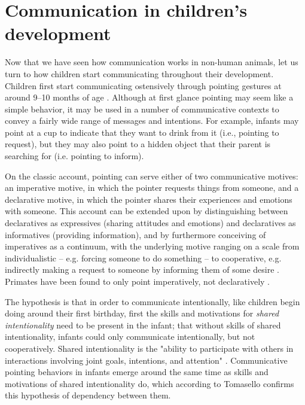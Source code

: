 \section{Communication in children's development}
\label{sec:comm:ontogeny}

Now that we have seen how communication works in non-human animals, let us turn to how children start communicating throughout their development.
Children first start communicating ostensively through pointing gestures at around 9--10 months of age \citep[pp.~20--21 and references therein]{Carpenter98}.
Although at first glance pointing may seem like a simple behavior, it may be used in a number of communicative contexts to convey a fairly wide range of messages and intentions.
For example, infants may point at a cup to indicate that they want to drink from it (i.e., pointing to request), but they may also point to a hidden object that their parent is searching for (i.e. pointing to inform).

On the classic account, pointing can serve either of two communicative motives: an imperative motive, in which the pointer requests things from someone, and a declarative motive, in which the pointer shares their experiences and emotions with someone.
This account can be extended upon by distinguishing between declaratives as expressives (sharing attitudes and emotions) and declaratives as informatives (providing information), and by furthermore conceiving of imperatives as a continuum, with the underlying motive ranging on a scale from individualistic -- e.g. forcing someone to do something -- to cooperative, e.g. indirectly making a request to someone by informing them of some desire \citep{Tomasello08}.
Primates have been found to only point imperatively, not declaratively \citep{Gomez04, Tomasello05}.

The hypothesis is that in order to communicate intentionally,
like children begin doing around their first birthday, first the skills and motivations for \emph{shared intentionality} need to be present in the infant; that without skills of shared intentionality, infants could only communicate intentionally, but not cooperatively.
Shared intentionality is the "ability to participate with others in interactions involving joint goals, intentions, and attention" \citep[p.~139]{Tomasello08}. Communicative pointing behaviors in infants emerge around the same time as skills and motivations of shared intentionality do, which according to Tomasello confirms this hypothesis of dependency between them.

